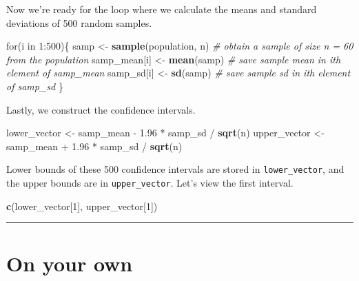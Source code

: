 \documentclass[]{book}
\newenvironment{Shaded}{\begin{snugshade}}{\end{snugshade}}
\newcommand{\KeywordTok}[1]{\textcolor[rgb]{0.13,0.29,0.53}{\textbf{{#1}}}}
\newcommand{\DecValTok}[1]{\textcolor[rgb]{0.00,0.00,0.81}{{#1}}}
\newcommand{\FloatTok}[1]{\textcolor[rgb]{0.00,0.00,0.81}{{#1}}}
\newcommand{\StringTok}[1]{\textcolor[rgb]{0.31,0.60,0.02}{{#1}}}
\newcommand{\CommentTok}[1]{\textcolor[rgb]{0.56,0.35,0.01}{\textit{{#1}}}}
\newcommand{\NormalTok}[1]{{#1}}
\theoremstyle{definition}
\theoremstyle{definition}
\theoremstyle{definition}
\theoremstyle{remark}
\begin{document}
Now we're ready for the loop where we calculate the means and standard
deviations of 500 random samples.

\begin{Shaded}
\begin{Highlighting}[]
\NormalTok{for(i in }\DecValTok{1}\NormalTok{:}\DecValTok{500}\NormalTok{)\{}
  \NormalTok{samp <-}\StringTok{ }\KeywordTok{sample}\NormalTok{(population, n) }\CommentTok{# obtain a sample of size n = 60 from the population}
  \NormalTok{samp_mean[i] <-}\StringTok{ }\KeywordTok{mean}\NormalTok{(samp)    }\CommentTok{# save sample mean in ith element of samp_mean}
  \NormalTok{samp_sd[i] <-}\StringTok{ }\KeywordTok{sd}\NormalTok{(samp)        }\CommentTok{# save sample sd in ith element of samp_sd}
\NormalTok{\}}
\end{Highlighting}
\end{Shaded}

Lastly, we construct the confidence intervals.

\begin{Shaded}
\begin{Highlighting}[]
\NormalTok{lower_vector <-}\StringTok{ }\NormalTok{samp_mean -}\StringTok{ }\FloatTok{1.96} \NormalTok{*}\StringTok{ }\NormalTok{samp_sd /}\StringTok{ }\KeywordTok{sqrt}\NormalTok{(n)}
\NormalTok{upper_vector <-}\StringTok{ }\NormalTok{samp_mean +}\StringTok{ }\FloatTok{1.96} \NormalTok{*}\StringTok{ }\NormalTok{samp_sd /}\StringTok{ }\KeywordTok{sqrt}\NormalTok{(n)}
\end{Highlighting}
\end{Shaded}

Lower bounds of these 500 confidence intervals are stored in
\texttt{lower\_vector}, and the upper bounds are in
\texttt{upper\_vector}. Let's view the first interval.

\begin{Shaded}
\begin{Highlighting}[]
\KeywordTok{c}\NormalTok{(lower_vector[}\DecValTok{1}\NormalTok{], upper_vector[}\DecValTok{1}\NormalTok{])}
\end{Highlighting}
\end{Shaded}

\begin{center}\rule{0.5\linewidth}{\linethickness}\end{center}

\section{On your own}\label{on-your-own-4}
\end{document}
